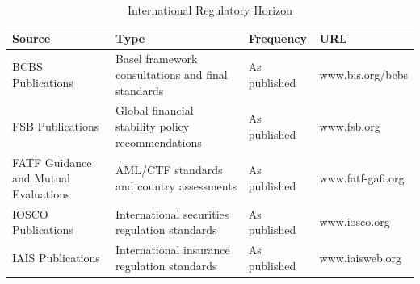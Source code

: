 \begin{table}[H]
  \centering
  \renewcommand{\arraystretch}{1.5}
  \begin{tabularx}{\textwidth}{ | >{\raggedright\arraybackslash}p{} 
								| >{\raggedright\arraybackslash}p{} 
								| >{\raggedright\arraybackslash}p{} 
                                | >{\raggedright\arraybackslash}X | }
    \hline
    \textbf{Source} & \textbf{Type} & \textbf{Frequency} & \textbf{URL}  \\
    \hline
    BCBS Publications & Basel framework consultations and final standards & As published & www.bis.org/bcbs\\
    \hline
    FSB Publications & Global financial stability policy recommendations & As published & www.fsb.org\\
    \hline
    FATF Guidance and Mutual Evaluations & AML/CTF standards and country assessments & As published & www.fatf-gafi.org\\
    \hline
    IOSCO Publications & International securities regulation standards & As published & www.iosco.org\\
    \hline
    IAIS Publications & International insurance regulation standards & As published & www.iaisweb.org\\
    \hline
  \end{tabularx}
  \caption{International Regulatory Horizon}
\end{table}
